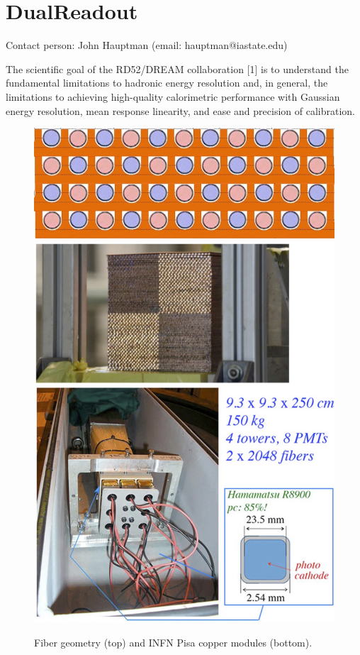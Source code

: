 \section{DualReadout}
Contact person: John Hauptman (email:  hauptman@iastate.edu)


The scientific goal of the RD52/DREAM collaboration [1] is to understand the fundamental limitations
to hadronic energy resolution and, in general, the limitations to achieving high-quality calorimetric
performance with Gaussian energy resolution, mean response linearity, and ease and precision of calibration.

\begin{figure}
 \centering
 \includegraphics[scale=0.26]{f32-fibers.jpg}
  \includegraphics[scale=0.26]{f33-pisa-module.jpg}
   \label{fig:pisa}
 \caption{Fiber geometry (top) and INFN Pisa copper modules (bottom).}
\end{figure}


